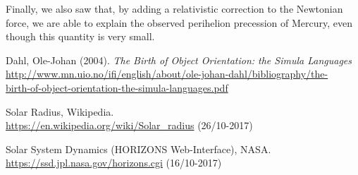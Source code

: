\documentclass[12pt, a4paper]{article}
\begin{document}
Finally, we also saw that, by adding a relativistic correction to the Newtonian force, we are able to 
explain the observed perihelion precession of Mercury, even though this quantity is very small.  


\begin{thebibliography}{40}

 Dahl, Ole-Johan (2004). \textit{The Birth of Object Orientation:  the Simula
Languages} \\
\href{http://www.mn.uio.no/ifi/english/about/ole-johan-dahl/bibliography/the-birth-of-object-orientation-the-simula-languages.pdf}{http://www.mn.uio.no/ifi/english/about/ole-johan-dahl/bibliography/the-\\birth-of-object-orientation-the-simula-languages.pdf}

 Solar Radius, Wikipedia. \\ 
\href{https://en.wikipedia.org/wiki/Solar\_radius}{https://en.wikipedia.org/wiki/Solar\_radius} 
(26/10-2017)

 Solar System Dynamics (HORIZONS Web-Interface), NASA. \\
\href{https://ssd.jpl.nasa.gov/horizons.cgi}{https://ssd.jpl.nasa.gov/horizons.cgi} (16/10-2017)


\end{thebibliography}
\end{document}
